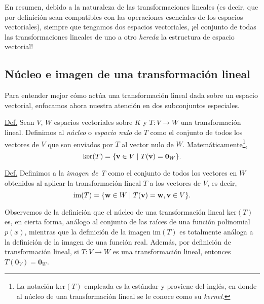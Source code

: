 \documentclass[12pt]{article}
\begin{document}
\vspace{3mm}
En resumen, debido a la naturaleza de las transformaciones lineales (es decir, que por definición sean compatibles con las operaciones esenciales de los espacios vectoriales), siempre que tengamos dos espacios vectoriales, ¡el conjunto de todas las transformaciones lineales de uno a otro \emph{hereda} la estructura de espacio vectorial! 

\subsection{Núcleo e imagen de una transformación lineal}

Para entender mejor cómo actúa una transformación lineal dada sobre un espacio vectorial, enfocamos ahora nuestra atención en dos subconjuntos especiales.

\begin{tcolorbox} \label{Def:Nucleo_e_imagen_de_una_transformación_lineal} 
 
    \underline{Def.} Sean $V$, $W$ espacios vectoriales sobre $K$ y $T:V\to W$ una transformación lineal. Definimos al \emph{núcleo} o \emph{espacio nulo} de $T$ como el conjunto de todos los vectores de $V$ que son enviados por $T$ al vector nulo de $W$. Matemáticamente\footnote{La notación $\text{ker}(T)$ empleada es la estándar y proviene del inglés, en donde al núcleo de una transformación lineal se le conoce como su \emph{kernel}.}, $$\text{ker}(T)=\{ \mathbf{v}\in V\hspace{1mm}|\hspace{1mm}T(\mathbf{v})=\mathbf{0}_W\}.$$ 

    \vspace{3mm} 

    \underline{Def.} Definimos a la \emph{imagen de T} como el conjunto de todos los vectores en $W$ obtenidos al aplicar la transformación lineal $T$ a los vectores de $V$, es decir, $$\text{im}(T)=\{\mathbf{w}\in W\hspace{1mm} |\hspace{1mm} T(\mathbf{v})=\mathbf{w}, \mathbf{v}\in V\}.$$

\end{tcolorbox}

Observemos de la definición que el núcleo de una transformación lineal $\text{ker}(T)$ es, en cierta forma, análogo al conjunto de las raíces de una función polinomial $p(x)$, mientras que la definición de la imagen $\text{im}(T)$ es totalmente análoga a la definición de la imagen de una función real. Además, por definición de transformación lineal, si $T:V\to W$ es una transformación lineal, entonces $T(\mathbf{0}_V)=\mathbf{0}_W$.
\end{document}
